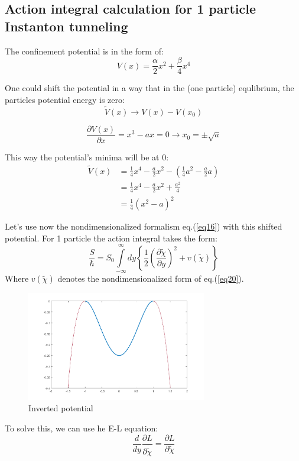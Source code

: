 \documentclass[12pt,a4paper]{article}
\numberwithin{equation}{section}
\begin{document}
\newpage
\subsection{Action integral calculation for 1 particle Instanton tunneling}

The confinement potential is in the form of:
\begin{equation}
{V}(x) = \frac{\alpha}{2} x^2 + \frac{\beta}{4} x^4
\end{equation}

One could shift the potential in a way that in the (one particle) equlibrium, the particles potential energy is zero:
$$
\tilde{V}(x) \rightarrow V(x) - V(x_0)
$$

\[
\frac{\partial V(x)}{\partial x} = x^3 - a x = 0 \rightarrow x_0 = \pm \sqrt{a}
\]

This way the potential's minima will be at 0:
\begin{align}\label{eq20}
\tilde{V}(x) &= \frac{1}{4} x^4 - \frac{a}{2}x^2 - \left( \frac{1}{4}a^2 - \frac{a}{2}a\right)\\ \nonumber
 &= \frac{1}{4}x^4 - \frac{a}{2}x^2 + \frac{a^2}{4} \\ \nonumber
 &= \frac{1}{4} (x^2 - a)^2
\end{align}

Let's use now the nondimensionalized formalism eq.(\ref{eq16}) with this shifted potential. For 1 particle the action integral takes the form:
\begin{equation}
\frac{S}{\hbar} = S_0 \int\limits_{-\infty}^\infty  dy \left\lbrace \frac{1}{2} \left(\frac{\partial \tilde{\chi}}{\partial y} \right)^2 + v(\tilde{\chi})\right\rbrace
\end{equation}
Where $v(\tilde{\chi}) $ denotes the nondimensionalized form of eq.(\ref{eq20}).


\begin{figure}[H]
\centering
\includegraphics[width = 0.7\textwidth]{inverted_pot}
\caption{Inverted potential}
\end{figure}
To solve this, we can use he E-L equation:
\[
\frac{d}{dy}\frac{\partial L}{\partial \dot{\tilde{\chi}}} = \frac{\partial L}{\partial \tilde{\chi}}
\]
\end{document}
